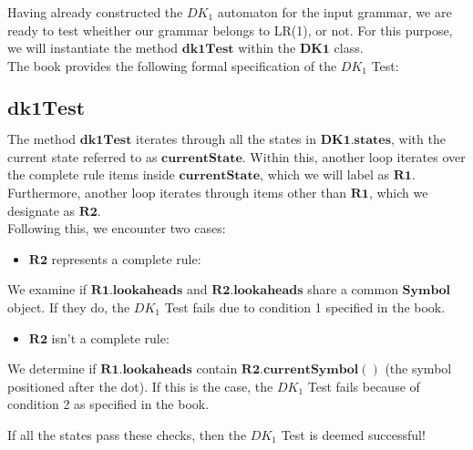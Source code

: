 Having already constructed the \(DK_{1}\) automaton for the input grammar, we are ready to test wheither our grammar belongs to LR(1), or not. For this purpose, we will instantiate the method \(\boldsymbol{dk1Test}\) within the \(\boldsymbol{DK1}\) class.\\

The book provides the following formal specification of the \(DK_{1}\) Test:


\vspace{20pt}

\subsection{\(\boldsymbol{dk1Test}\)}

The method \(\boldsymbol{dk1Test}\) iterates through all the states in \(\boldsymbol{DK1.states}\), with the current state referred to as \(\boldsymbol{currentState}\). Within this, another loop iterates over the complete rule items inside \(\boldsymbol{currentState}\), which we will label as \(\boldsymbol{R1}\). Furthermore, another loop iterates through items other than \(\boldsymbol{R1}\), which we designate as \(\boldsymbol{R2}\).\\

Following this, we encounter two cases:
\begin{itemize}
    \item \(\boldsymbol{R2}\) represents a complete rule:
\end{itemize}

We examine if \(\boldsymbol{R1.lookaheads}\) and \(\boldsymbol{R2.lookaheads}\) share a common \(\boldsymbol{Symbol}\) object. If they do, the \(DK_{1}\) Test fails due to condition 1 specified in the book.

\begin{itemize}
    \item \(\boldsymbol{R2}\) isn't a complete rule:
\end{itemize}

We determine if \(\boldsymbol{R1.lookaheads}\) contain \(\boldsymbol{R2.currentSymbol()}\) (the symbol positioned after the dot). If this is the case, the \(DK_{1}\) Test fails because of condition 2 as specified in the book.

If all the states pass these checks, then the \(DK_{1}\) Test is deemed successful!\\

